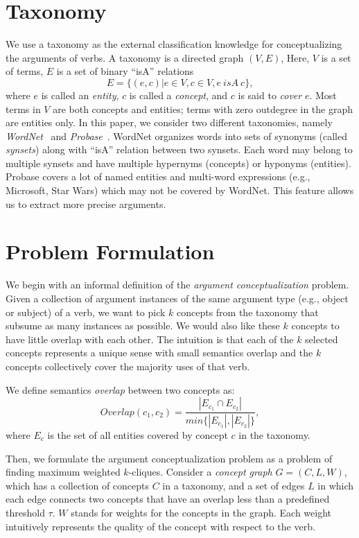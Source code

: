 \section{Taxonomy}
\label{sec:tax}
We use a taxonomy as the external classification knowledge for
conceptualizing the arguments of verbs.
A taxonomy is a directed graph $(V, E)$,
Here, $V$ is a set of terms, $E$ is a set of binary ``isA'' relations
\[E=\{(e,c)| e\in V, c\in V, e~ isA~ c\},\]
where $e$ is called an {\em entity},
$c$ is called a {\em concept}, and $c$ is said to {\em cover} $e$.
Most terms in $V$ are
both concepts and entities; terms with zero outdegree in the graph are entities only. 
In this paper, we consider two different taxonomies,
namely {\em WordNet}~\cite{miller1998wordnet} and {\em Probase}~\cite{wu2012probase}.
WordNet organizes words into sets of synonyms
(called {\em synsets}) along with ``isA'' relation between two synsets.
Each word may belong to multiple synsets and have multiple
hypernyms (concepts) or hyponyms (entities).
Probase covers a lot of named entities and multi-word expressions
(e.g., Microsoft, Star Wars) which may not be covered by WordNet.
This feature allows us to extract more precise arguments.

\section{Problem Formulation}
\label{sec:problem}

We begin with an informal definition of the
{\em argument conceptualization} problem.
Given a collection of argument instances of the same argument
type (e.g., object or subject) of a verb,
we want to pick $k$ concepts from the taxonomy
that subsume as many instances as possible.
We would also like these $k$ concepts to
have little overlap with each other.
The intuition is that each of the $k$ selected concepts represents a unique
sense with small semantics overlap and the $k$ concepts collectively cover the majority
uses of that verb.

We define semantics {\em overlap} between two concepts as:
$$Overlap(c_1,c_2)=\frac{|E_{c_1}\cap E_{c_2}|}{min\{ |E_{c_1}|,|E_{c_2}| \}},$$
where $E_c$ is the set of all entities covered by concept $c$ in
the taxonomy.

Then, we formulate the argument conceptualization problem as
a problem of finding maximum weighted $k$-cliques. Consider a \emph{concept graph}
$G=(C,L,W)$, which has a collection of concepts $C$ in a taxonomy,
and a set of edges $L$ in which each edge connects two concepts that
have an overlap less than a predefined threshold $\tau$. $W$ stands for
weights for the concepts in the graph.
Each weight intuitively represents the quality of
the concept with respect to the verb.

